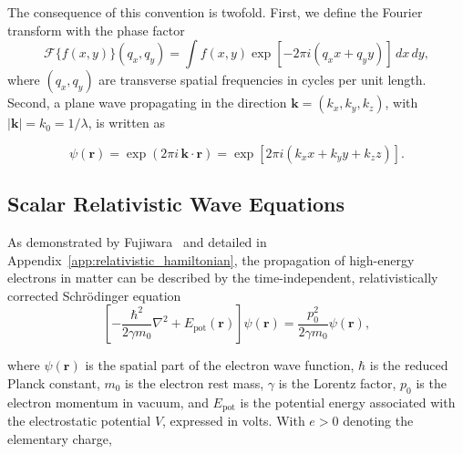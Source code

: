 \documentclass[preprint,12pt,number]{elsarticle}
\begin{document}
The consequence of this convention is twofold. First, we define the Fourier
transform with the phase factor
\begin{equation}
\mathcal F\{f(x,y)\}(q_x,q_y)
=
\int f(x,y)
\exp\left[-2\pi i(q_x x+q_y y)\right]\,dx\,dy,
\label{eq:fourier_convention}
\end{equation}
where $(q_x,q_y)$ are transverse spatial frequencies in cycles per unit length.
Second, a plane wave propagating in the direction
$\mathbf k=(k_x,k_y,k_z)$, with
$|\mathbf k|=k_0=1/\lambda$, is written as

\begin{equation}
\psi(\mathbf{r})
=
\exp\!\left(2\pi i\,\mathbf{k}\cdot\mathbf{r}\right)
=
\exp\!\left[2\pi i\left(k_x x+k_y y+k_z z\right)\right].
\label{eq:plane_wave_convention}
\end{equation}

\subsection{Scalar Relativistic Wave Equations}
\label{sec:schrodinger_helmholtz}


As demonstrated by Fujiwara~\cite{fujiwara1961relativistic} and detailed in
Appendix~\ref{app:relativistic_hamiltonian}, the propagation of high-energy
electrons in matter can be described by the time-independent,
relativistically corrected Schr\"odinger equation
\begin{equation}
\left[
-\frac{\hbar^2}{2\gamma m_0}\nabla^2
+
E_{\mathrm{pot}}(\mathbf r)
\right]\psi(\mathbf r)
=
\frac{p_0^2}{2\gamma m_0}\psi(\mathbf r),
\label{eq:corrected_schrodinger_main}
\end{equation}

where $\psi(\mathbf r)$ is the spatial part of the electron wave function,
$\hbar$ is the reduced Planck constant, $m_0$ is the electron rest mass,
$\gamma$ is the Lorentz factor, $p_0$ is the electron momentum in vacuum, and
$E_{\mathrm{pot}}$ is the potential energy associated with the electrostatic
potential $V$, expressed in volts. With $e>0$ denoting the elementary charge,
\end{document}
